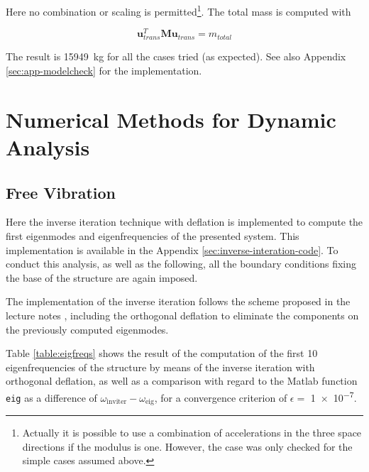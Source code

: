 \documentclass[AMdocument,optEnglish]{AMlatex}  %
\begin{document}
Here no combination or scaling is permitted\footnote{Actually it is possible to use a combination of accelerations in the three space directions if the modulus is one. However, the case was only checked for the simple cases assumed above.}. The total mass is computed with 

\begin{equation}
	\bm{u}_{trans}^T \bm{M} \bm{u}_{trans} = m_{total}
\end{equation}

The result is \SI{15949}{\kilogram} for all the cases tried (as expected). See also Appendix \ref{sec:app-modelcheck} for the implementation.

\section{Numerical Methods for Dynamic Analysis}
\label{sec:numerical-methods}

\subsection{Free Vibration}

Here the inverse iteration technique with deflation is implemented to compute the first eigenmodes and eigenfrequencies of the presented system. This implementation is available in the Appendix \ref{sec:inverse-interation-code}. To conduct this analysis, as well as the following, all the boundary conditions fixing the base of the structure are again imposed. 

The implementation of the inverse iteration follows the scheme proposed in the lecture notes \cite{strucdyn-lecnot}, including the orthogonal deflation to eliminate the components on the previously computed eigenmodes. 

Table \ref{table:eigfreqs} shows the result of the computation of the first 10 eigenfrequencies of the structure by means of the inverse iteration with orthogonal deflation, as well as a comparison with regard to the Matlab function \verb|eig| as a difference of $\omega_{\text{inviter}} - \omega_{\text{eig}}$, for a convergence criterion of $\epsilon =$ \num{1e-7}.
\end{document}
